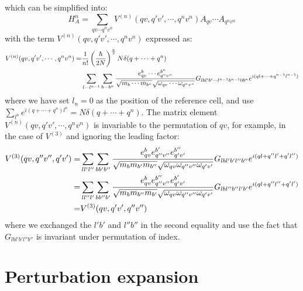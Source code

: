 \documentclass{article}
\begin{document}
which can be simplified into:
\begin{equation}
    H_{A}^{n} = \sum_{qv \cdots q^nv^n} V^{(n)}(qv,q'v',\cdots,q^nv^n)
    A_{qv} \cdots A_{q^nv^n}
\end{equation}
with the term $V^{(n)}(qv,q'v',\cdots,q^nv^n)$ expressed as:
\begin{align}
    V^{(n)}(qv,q'v',\cdots,q^nv^n) = &\frac{1}{n!} \left( \frac{\hbar}{2N} \right)^{\frac{n}{2}} N\delta(q + \cdots + q^n) \notag \\
     &\sum_{l\cdots l^{n-1}} \sum_{b\cdots b^n} 
    \frac{e_{qv}^b \cdots e_{q^nv^n}^{b^n}}{\sqrt{m_b \cdots m_{b^n}}\sqrt{\omega_{qv} \cdots \omega_{q^nv^n}}} G_{lbl'b'\cdots l^{n-1}b^{n-1}0b^n} e^{i(ql + \cdots + q^{n-1}l^{n-1})}
\end{align}
where we have set $l_n = 0$ as the position of the reference cell, and use $\sum_{l^n} e^{i(q+\cdots+q^n)l^n} = N \delta(q + \cdots + q^n) $. The matrix element 
$V^{(n)}(qv,q'v',\cdots,q^nv^n)$ is invariable to the permutation of $qv$, for example, in the case of $V^{(3)}$ and ignoring the leading factor:
\begin{align}
    V^{(3)}(qv,q''v'',q'v') = & \sum_{ll'l''} \sum_{bb'b''} 
    \frac{e_{qv}^b e_{q''v''}^{b'} e_{q'v'}^{b''} }{\sqrt{m_b m_{b'} m_{b''}} \sqrt{\omega_{qv}\omega_{q''v''}\omega_{q'v'}}} G_{lbl'b'l''b''} e^{i(ql + q''l' + q'l'')} \notag \\
    = &\sum_{ll''l'} \sum_{bb''b'} 
    \frac{e_{qv}^b e_{q''v''}^{b''} e_{q'v'}^{b'} }{\sqrt{m_b m_{b''} m_{b'}} \sqrt{\omega_{qv}\omega_{q''v''}\omega_{q'v'}}} G_{lbl''b''l'b'} e^{i(ql + q''l'' + q'l')} \notag \\
    = &V^{(3)}(qv,q'v',q''v'')
\end{align}
where we exchanged the $l'b'$ and $l''b''$ in the second equality and use the fact that $G_{lbl'b'l''b''}$ is invariant under permutation of index.

\section{Perturbation expansion}
\label{section:perturbationexpansion}
\end{document}
